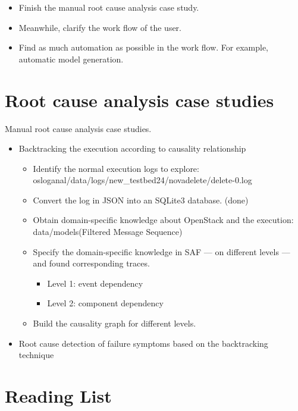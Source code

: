 \documentclass{article}
\begin{document}
\begin{itemize}
\item Finish the manual root cause analysis case study.
\item Meanwhile, clarify the work flow of the user.
\item Find as much automation as possible in the work flow. For example,
  automatic model generation.
\end{itemize}

\section{Root cause analysis case studies}
Manual root cause analysis case studies.

\begin{itemize}
\item Backtracking the execution according to causality relationship
  \begin{itemize}
  \item Identify the normal execution logs to explore: osloganal/data/logs/new\_testbed24/novadelete/delete-0.log
  \item Convert the log in JSON into an SQLite3 database. (done)
  \item Obtain domain-specific knowledge about OpenStack and the execution:
    data/models(Filtered Message Sequence)
  \item Specify the domain-specific knowledge in SAF --- on different levels ---
    and found corresponding traces.
    \begin{itemize}
    \item Level 1: event dependency
    \item Level 2: component dependency
    \end{itemize}
  \item Build the causality graph for different levels.
  \end{itemize}
\item Root cause detection of failure symptoms based on the backtracking technique
\end{itemize}

\section{Reading List}
\label{sec:read}
\end{document}
